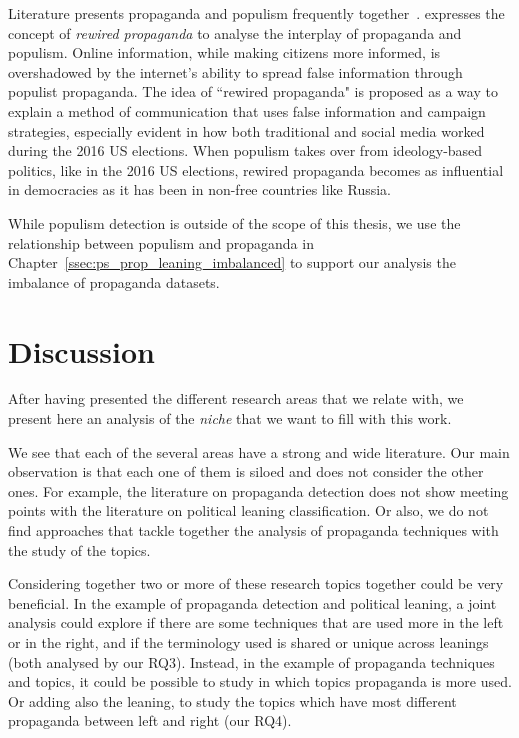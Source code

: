 Literature presents propaganda and populism frequently together~\cite{oates2021rewired,tumber2021routledge,pasquino2008populism}.
\citet{oates2021rewired} expresses the
concept of \emph{rewired propaganda} to analyse the interplay of propaganda and populism. Online information, while making citizens more informed, is overshadowed by the internet's ability to spread false information through populist propaganda.
The idea of ``rewired propaganda" is proposed as a way to explain a method of communication that uses false information and campaign strategies, especially evident in how both traditional and social media worked during the 2016 US elections.
When populism takes over from ideology-based politics, like in the 2016 US elections, rewired propaganda becomes as influential in democracies as it has been in non-free countries like Russia.

While populism detection is outside of the scope of this thesis, we use the relationship between populism and propaganda in Chapter~\ref{ssec:ps_prop_leaning_imbalanced} to support our analysis the imbalance of propaganda datasets.




\section{\statusgreen Discussion}
\label{sec:lit_discussion}

After having presented the different research areas that we relate with, we present here an analysis of the \emph{niche} that we want to fill with this work.

We see that each of the several areas have a strong and wide literature.
Our main observation is that each one of them is siloed and does not consider the other ones.
For example, the literature on propaganda detection does not show meeting points with the literature on political leaning classification.
Or also, we do not find approaches that tackle together the analysis of propaganda techniques with the study of the topics.

Considering together two or more of these research topics together could be very beneficial.
In the example of propaganda detection and political leaning, a joint analysis could explore if there are some techniques that are used more in the left or in the right, and if the terminology used is shared or unique across leanings (both analysed by our RQ3).
Instead, in the example of propaganda techniques and topics, it could be possible to study in which topics propaganda is more used. Or adding also the leaning, to study the topics which have most different propaganda between left and right (our RQ4). 

